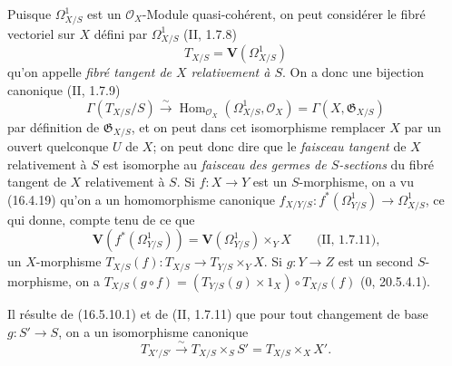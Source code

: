 \begin{env}[16.5.12]
Puisque $\Omega_{X/S}^1$ est un $\mathcal{O}_X$-Module quasi-cohérent, on peut
considérer le fibré vectoriel sur $X$ défini par $\Omega_{X/S}^1$
(II, 1.7.8)
\[
  T_{X/S}=\mathbf{V}(\Omega_{X/S}^1)
  \tag{16.5.12.1}
  \label{IV.16.5.12.1}
\]
qu'on appelle \emph{fibré tangent de $X$ relativement à $S$}. On a donc une
bijection canonique (II, 1.7.9)
\[
  \Gamma(T_{X/S}/S)\xrightarrow{\sim}
  \operatorname{Hom}_{\mathcal{O}_X}(\Omega_{X/S}^1,\mathcal{O}_X)
  =\Gamma(X,\mathfrak{G}_{X/S})
\]
par définition de $\mathfrak{G}_{X/S}$, et on peut dans cet isomorphisme
remplacer $X$ par un ouvert quelconque $U$ de $X$; on peut donc dire que le
\emph{faisceau tangent} de $X$ relativement à $S$ est isomorphe au
\emph{faisceau des germes de $S$-sections} du fibré tangent de $X$
relativement à $S$. Si $f:X\to Y$ est un $S$-morphisme, on a vu (16.4.19)
qu'on a un homomorphisme canonique
$f_{X/Y/S}:f^*(\Omega_{Y/S}^1)\to\Omega_{X/S}^1$, ce qui donne, compte tenu de
ce que
\[
  \mathbf{V}(f^*(\Omega_{Y/S}^1))
  =\mathbf{V}(\Omega_{Y/S}^1)\times_Y X\qquad\text{(II, 1.7.11),}
\]
un $X$-morphisme
$T_{X/S}(f):T_{X/S}\to T_{Y/S}\times_Y X$. Si $g:Y\to Z$ est un second
$S$-morphisme, on a
$T_{X/S}(g\circ f)=(T_{Y/S}(g)\times1_X)\circ T_{X/S}(f)$ (0, 20.5.4.1).

Il résulte de (16.5.10.1) et de (II, 1.7.11) que pour tout changement de base
$g:S'\to S$, on a un isomorphisme canonique
\[
  T_{X'/S'}\xrightarrow{\sim}T_{X/S}\times_S S'
  =T_{X/S}\times_X X'.
  \tag{16.5.12.2}
  \label{IV.16.5.12.2}
\]
\end{env}

